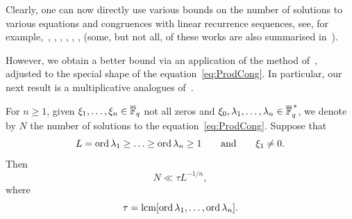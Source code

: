 \documentclass[12pt]{amsart}
\begin{document}
  
Clearly, one can now directly use various bounds on the number of solutions to various equations and congruences
with  linear recurrence sequences,
 see, for example,~\cite[Lemma~6]{BFKS}, 
\cite[Lemma~7]{CFKLLS}, \cite[Lemma~9]{CFS}, 
\cite[Proposition~A.1]{CoZa}, \cite[Lemma 6]{FKS},  \cite[Lemma~2]{Shp1},
\cite[Theorem~1]{Shp2}  (some, but not all, of these works are 
also summarised in~\cite[Section~5.4]{EvdPSW}). 

However, we obtain a  better bound via an application of the method of~\cite{CFKLLS}, 
adjusted to the special shape of the equation~\eqref{eq:ProdCong}. In particular, 
our  next result is a multiplicative analogues of~\cite[Lemma~7]{CFKLLS}.
 

 
 
\begin{lemma}
\label{lem:ProdEq}
For 
$n \ge 1$, given 
$ \xi_1, \ldots,  \xi_n \in  \overline {{\mathbb F}}_q$  not all  zeros and  $ \xi_0,  \lambda_1, \ldots, \lambda_n \in  \overline {{\mathbb F}}_q^{\,*}$,  
we denote by $N$ the number of solutions  to  the equation~\eqref{eq:ProdCong}. 
Suppose  that 
$$
L =  \operatorname{ord} \lambda_1 \ge \ldots \ge  \operatorname{ord} \lambda_n\ge 1 \qquad\mbox{and}\qquad \xi_1 \ne 0. 
$$
Then
$$
N  \ll \tau L^{ - 1/n},
$$
where  
$$
\tau= \operatorname{lcm}[\operatorname{ord} \lambda_1, \ldots, \operatorname{ord}\lambda_n].
$$
\end{lemma}
\end{document}
